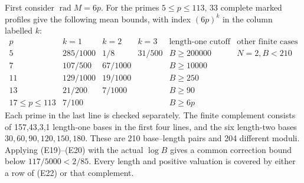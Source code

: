 \documentclass[11pt]{article}
\theoremstyle{definition}\newtheorem{definition}[theorem]{Definition}
\theoremstyle{remark}\newtheorem{remark}[theorem]{Remark}
\newcommand{\rad}{\operatorname{rad}}
\begin{document}
First consider \(\rad M=6p\). For the primes \(5\le p\le113\),
33 complete marked profiles give the following mean bounds, with
index \((6p)^k\) in the column labelled \(k\):
\[
\begin{array}{c|ccc|ll}
 p&k=1&k=2&k=3&\text{length-one cutoff}&\text{other finite cases}\\\hline
5&285/1000&1/8&31/500&B\ge200000&N=2,B<210\\
7&107/500&67/1000&&B\ge10000&\\
11&129/1000&19/1000&&B\ge250&\\
13&21/200&7/1000&&B\ge90&\\
17\le p\le113&7/100&&&B\ge6p&
\end{array}                                                        \tag{E22}
\]
Each prime in the last line is checked separately. The finite
complement consists of 157,43,3,1 length-one bases in the first four
lines, and the six length-two bases \(30,60,90,120,150,180\).
These are 210 base--length pairs and 204 different moduli. Applying
(E19)--(E20) with the actual \(\log B\) gives a common correction
bound below \(117/5000<2/85\). Every length and positive valuation is
covered by either a row of (E22) or that complement.
\end{document}
